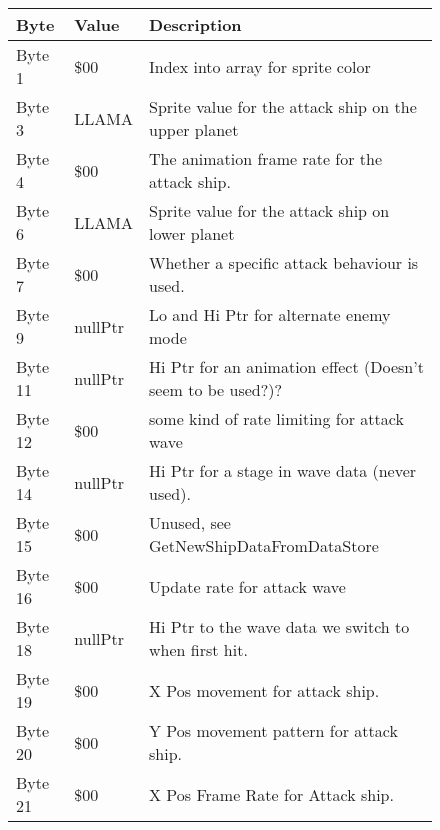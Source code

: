 \begin{figure}[H]
  {
  \setlength{\tabcolsep}{3.0pt}
  \setlength\cmidrulewidth{\heavyrulewidth} %
  \begin{adjustbox}{width=12cm}

\begin{tabular}{lll}
\toprule
 Byte    & Value                     & Description                                                        \\
\midrule
 Byte 1  & \$00                       & Index into array for sprite color                                  \\
 Byte 3  & LLAMA                     & Sprite value for the attack ship on the upper planet               \\
 Byte 4  & \$00                       & The animation frame rate for the attack ship.                      \\
 Byte 6  & LLAMA                     & Sprite value for the attack ship on lower planet                   \\
 Byte 7  & \$00                       & Whether a specific attack behaviour is used.                       \\
 Byte 9  & nullPtr                   & Lo and Hi Ptr for alternate enemy mode                             \\
 Byte 11 & nullPtr                   & Hi Ptr for an animation effect (Doesn't seem to be used?)?         \\
 Byte 12 & \$00                       & some kind of rate limiting for attack wave                         \\
 Byte 14 & nullPtr                   & Hi Ptr for a stage in wave data (never used).                      \\
 Byte 15 & \$00                       & Unused, see GetNewShipDataFromDataStore                            \\
 Byte 16 & \$00                       & Update rate for attack wave                                        \\
 Byte 18 & nullPtr                   & Hi Ptr to the wave data we switch to when first hit.               \\
 Byte 19 & \$00                       & X Pos movement for attack ship.                                    \\
 Byte 20 & \$00                       & Y Pos movement pattern for attack ship.                            \\
 Byte 21 & \$00                       & X Pos Frame Rate for Attack ship.                                  \\

\end{tabular}
\end{adjustbox}}
\end{figure}
